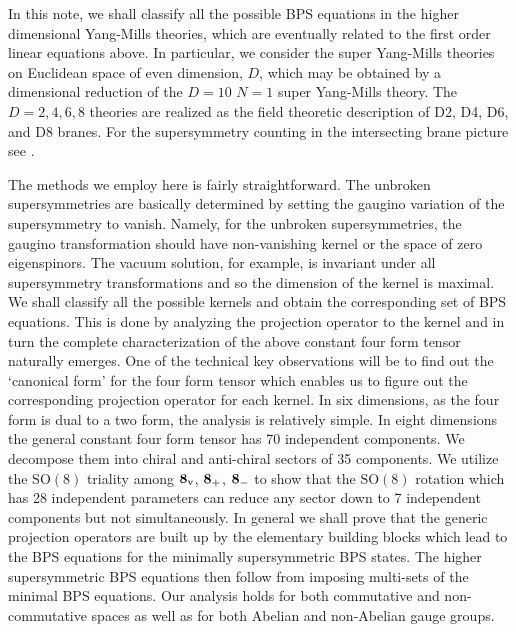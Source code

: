 \documentclass[a4paper,11pt]{article}
\begin{document}
In this note, we shall classify  all the possible BPS equations in the higher dimensional Yang-Mills theories, which are eventually related to the
first order linear equations  above. In particular, we consider the super Yang-Mills theories on Euclidean space of even   dimension, $D$, which may
be obtained by a dimensional reduction of the $D=10$  $N=1$ super  Yang-Mills theory. The $D=2, 4, 6, 8$  theories are  realized as the field
theoretic description of  D2, D4, D6, and D8 branes. For the supersymmetry counting in the intersecting brane picture see
\cite{OhtaTownsend,Chen:1999bf}.


The methods we employ here is  fairly straightforward. The unbroken supersymmetries are basically determined by setting the gaugino variation of the
supersymmetry to vanish. Namely, for the unbroken supersymmetries, the gaugino transformation  should have non-vanishing kernel or the space of zero
eigenspinors. The vacuum solution, for example, is invariant under all supersymmetry transformations and so the dimension of the kernel is maximal.
We shall classify all the possible kernels  and  obtain the corresponding set of  BPS equations. This is done by  analyzing the projection operator
to the kernel and in turn the complete characterization of the above constant four form tensor naturally emerges.  One of the technical key
observations will be  to find out  the `canonical form' for the four form tensor which  enables us to figure out the corresponding projection
operator for each kernel. In six dimensions, as the four form is dual to a two form, the analysis is relatively  simple.  In eight dimensions the
general constant four form tensor has 70 independent components. We decompose them into chiral and anti-chiral sectors of   35 components. We
utilize the $\mbox{SO}(8)$ triality among ${\bf 8}_{{\rm v}}$, ${\bf 8}_{+}$, ${\bf 8}_{-}$ to show that the $\mbox{SO}(8)$ rotation which has 28
independent parameters can reduce any  sector down to 7 independent components but not simultaneously.   In general we shall prove that the generic
projection operators are built up  by the elementary building blocks which lead to the BPS equations for the minimally supersymmetric BPS states.
The higher supersymmetric BPS equations  then follow from imposing   multi-sets of the minimal  BPS equations. Our analysis holds for both
commutative and non-commutative spaces as well as for both Abelian and non-Abelian gauge groups.
\end{document}
